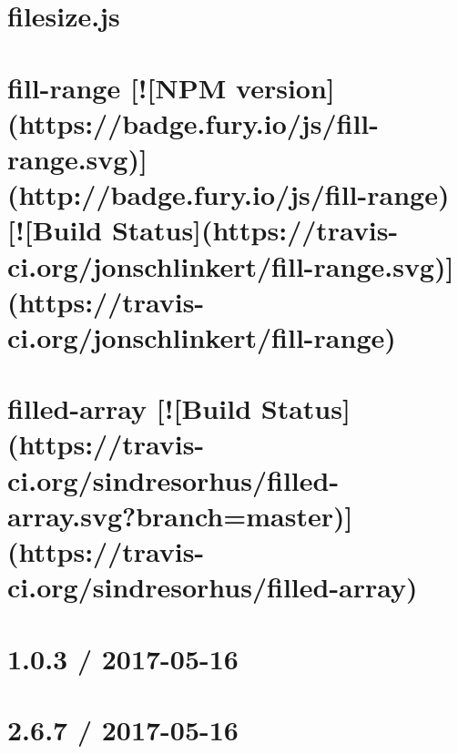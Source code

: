 \documentclass[twoside]{book}
\newcommand{\+}{\discretionary{\mbox{\scriptsize$\hookleftarrow$}}{}{}}
\begin{document}
\chapter{filesize.\+js}
\label{md__c_1_workspace_demo_src_main_script_node_modules_filesize__r_e_a_d_m_e}

\chapter{fill-\/range \mbox{[}!\mbox{[}N\+PM version\mbox{]}(https\+://badge.fury.\+io/js/fill-\/range.svg)\mbox{]}(http\+://badge.fury.\+io/js/fill-\/range) \mbox{[}!\mbox{[}Build Status\mbox{]}(https\+://travis-\/ci.org/jonschlinkert/fill-\/range.svg)\mbox{]}(https\+://travis-\/ci.org/jonschlinkert/fill-\/range)}
\label{md__c_1_workspace_demo_src_main_script_node_modules_fill-range__r_e_a_d_m_e}

\chapter{filled-\/array \mbox{[}!\mbox{[}Build Status\mbox{]}(https\+://travis-\/ci.org/sindresorhus/filled-\/array.svg?branch=master)\mbox{]}(https\+://travis-\/ci.org/sindresorhus/filled-\/array)}
\label{md__c_1_workspace_demo_src_main_script_node_modules_filled-array_readme}

\chapter{1.0.3 / 2017-\/05-\/16}
\label{md__c_1_workspace_demo_src_main_script_node_modules_finalhandler__h_i_s_t_o_r_y}

\chapter{2.6.7 / 2017-\/05-\/16}
\label{md__c_1_workspace_demo_src_main_script_node_modules_finalhandler_node_modules_debug__c_h_a_n_g_e_l_o_g}

\end{document}
